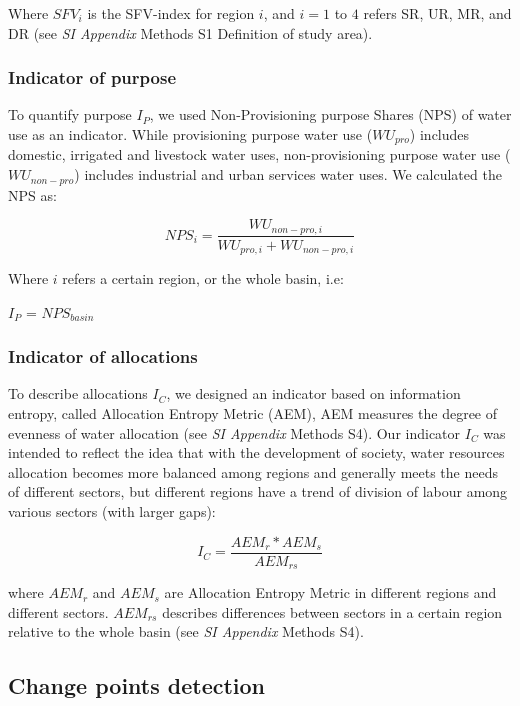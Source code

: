 \documentclass[9pt, twocolumn, twoside, lineno]{pnas-new}
\begin{document}
{	Where $SFV_i$ is the SFV-index for region $i$, and $i=1$ to $4$ refers SR, UR, MR, and DR (see \textit{SI Appendix} Methods S1 Definition of study area).

	\subsubsection*{Indicator of purpose}
	To quantify purpose $I_P$, we used Non-Provisioning purpose Shares (NPS) of water use as an indicator. While provisioning purpose water use ($WU_{pro}$) includes domestic, irrigated and livestock water uses, non-provisioning purpose water use ($WU_{non-pro}$) includes industrial and urban services water uses. We calculated the NPS as:

	$$ NPS_{i} = \frac{WU_{non-pro, i}}{WU_{pro, i} + WU_{non-pro, i}} $$

	Where $i$ refers a certain region, or the whole basin, i.e:

	$I_P$ = $NPS_{basin}$

	\subsubsection*{Indicator of allocations}
	To describe allocations $I_C$, we designed an indicator based on information entropy, called Allocation Entropy Metric (AEM), AEM measures the degree of evenness of water allocation (see \textit{SI Appendix} Methods S4).
	Our indicator $I_C$ was intended to reflect the idea that with the development of society, water resources allocation becomes more balanced among regions and generally meets the needs of different sectors, but different regions have a trend of division of labour among various sectors (with larger gaps):

	$$ I_C = \frac{AEM_{r}*AEM_{s}}{AEM_{rs}}$$
	
	where $AEM_{r}$ and $AEM_{s}$ are Allocation Entropy Metric in different regions and different sectors. $AEM_{rs}$ describes differences between sectors in a certain region relative to the whole basin (see \textit{SI Appendix} Methods S4). 

	\subsection*{Change points detection}

}
\end{document}
